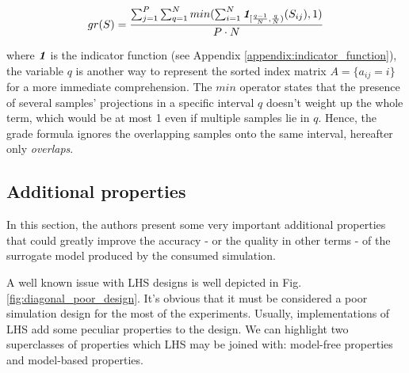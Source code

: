 \documentclass[12pt]{extarticle}
\newcommand{\mfigref}[1]{Fig.\ref{#1}}
\newcommand{\mappendixref}[1]{Appendix \ref{#1}}
\newcommand{\indfunc}[1]{\textit{\textbf{1}}_{#1}}
\begin{document}
\begin{equation}
\label{eq:grade}
gr(S) = \frac{\sum^P_{j=1}\sum^N_{q=1} min(\sum^N_{i=1}\indfunc{[\frac{q-1}{N}, \frac{q}{N})}(S_{ij}), 1)}{P \cdot N}
\end{equation}

where $\indfunc{}$ is the indicator function (see \mappendixref{appendix:indicator_function}), the variable $q$ is another way to represent the sorted index matrix $A = \{a_{ij} = i \}$ for a more immediate comprehension. The $min$ operator states that the presence of several samples' projections in a specific interval $q$ doesn't weight up the whole term, which would be at most 1 even if multiple samples lie in $q$. Hence, the grade formula ignores the overlapping samples onto the same interval, hereafter only \textit{overlaps}.

\subsection{Additional properties}
\label{subsec:lhs_properties}
In this section, the authors present some very important additional properties that could greatly improve the accuracy - or the quality in other terms - of the surrogate model produced by the consumed simulation.

A well known issue with LHS designs is well depicted in \mfigref{fig:diagonal_poor_design}. It's obvious that it must be considered a poor simulation design for the most of the experiments. Usually, implementations of LHS add some peculiar properties to the design. We can highlight two superclasses of properties which LHS may be joined with: model-free properties and model-based properties.
\end{document}
